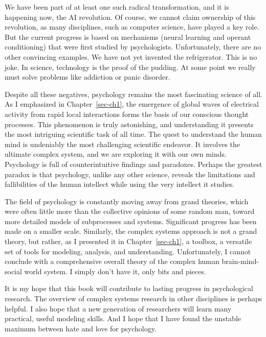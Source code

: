 \documentclass[
  a4paper,
  DIV=11,
  numbers=noendperiod,
  oneside]{scrreprt}
\begin{document}
We have been part of at least one such radical transformation, and it is
happening now, the AI revolution. Of course, we cannot claim ownership
of this revolution, as many disciplines, such as computer science, have
played a key role. But the current progress is based on mechanisms
(neural learning and operant conditioning) that were first studied by
psychologists. Unfortunately, there are no other convincing examples. We
have not yet invented the refrigerator. This is no joke. In science,
technology is the proof of the pudding. At some point we really must
solve problems like addiction or panic disorder.

Despite all these negatives, psychology remains the most fascinating
science of all. As I emphasized in Chapter~\ref{sec-ch1}, the emergence
of global waves of electrical activity from rapid local interactions
forms the basis of our conscious thought processes. This phenomenon is
truly astonishing, and understanding it presents the most intriguing
scientific task of all time. The quest to understand the human mind is
undeniably the most challenging scientific endeavor. It involves the
ultimate complex system, and we are exploring it with our own minds.
Psychology is full of counterintuitive findings and paradoxes. Perhaps
the greatest paradox is that psychology, unlike any other science,
reveals the limitations and fallibilities of the human intellect while
using the very intellect it studies.

The field of psychology is constantly moving away from grand theories,
which were often little more than the collective opinions of some random
man, toward more detailed models of subprocesses and systems.
Significant progress has been made on a smaller scale. Similarly, the
complex systems approach is not a grand theory, but rather, as I
presented it in Chapter~\ref{sec-ch1}, a toolbox, a versatile set of
tools for modeling, analysis, and understanding. Unfortunately, I cannot
conclude with a comprehensive overall theory of the complex human
brain-mind-social world system. I simply don't have it, only bits and
pieces.

It is my hope that this book will contribute to lasting progress in
psychological research. The overview of complex systems research in
other disciplines is perhaps helpful. I also hope that a new generation
of researchers will learn many practical, useful modeling skills. And I
hope that I have found the unstable maximum between hate and love for
psychology.

\end{document}

